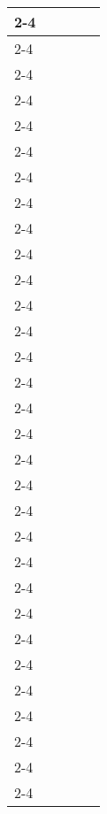 \documentclass{article}
\begin{document}
\begin{landscape}
\begin{table}[]
\centering
\begin{tabular}{l|l|l|l|l}
\cline{2-4}
 \hspace{10mm}&  &  &  &  \\ \cline{2-4}
 &  &  &  &  \\ \cline{2-4}
 &  &  &  &  \\ \cline{2-4}
 &  &  &  &  \\ \cline{2-4}
 &  &  &  &  \\ \cline{2-4}
 &  &  &  &  \\ \cline{2-4}
 &  &  &  &  \\ \cline{2-4}
 &  &  &  &  \\ \cline{2-4}
 &  &  &  &  \\ \cline{2-4}
 &  &  &  &  \\ \cline{2-4}
 &  &  &  &  \\ \cline{2-4}
 &  &  &  &  \\ \cline{2-4}
 &  &  &  &  \\ \cline{2-4}
 &  &  &  &  \\ \cline{2-4}
 &  &  &  &  \\ \cline{2-4}
 &  &  &  &  \\ \cline{2-4}
 &  &  &  &  \\ \cline{2-4}
 &  &  &  &  \\ \cline{2-4}
 &  &  &  &  \\ \cline{2-4}
 &  &  &  &  \\ \cline{2-4}
 &  &  &  &  \\ \cline{2-4}
 &  &  &  &  \\ \cline{2-4}
 &  &  &  &  \\ \cline{2-4}
 &  &  &  &  \\ \cline{2-4}
 &  &  &  &  \\ \cline{2-4}
 &  &  &  &  \\ \cline{2-4}
 &  &  &  &  \\ \cline{2-4}
 &  &  &  &  \\ \cline{2-4}
 &  &  &  &  \\ \cline{2-4}
 &  &  &  &  \\ \cline{2-4}
\end{tabular}
\end{table}
\end{landscape}
\end{document}
